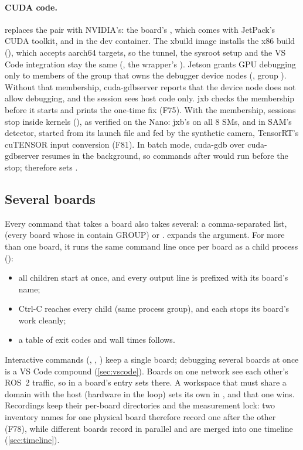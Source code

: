 \documentclass[11pt,a4paper]{article}
\newcommand{\jxb}{\textsf{jxb}}
\newcommand{\finding}[1]{\textsf{\small F#1}}
\begin{document}
\paragraph{CUDA code.}  replaces the pair with NVIDIA's: the board's , which comes
with JetPack's CUDA toolkit, and  in the dev container. The xbuild image installs the x86 build
(), which accepts aarch64 targets, so the tunnel, the sysroot setup and the VS Code integration
stay the same (, the wrapper's ). Jetson grants GPU debugging only to members
of the group that owns the debugger device nodes (, group ). Without that
membership, cuda-gdbserver reports that the device node does not allow debugging, and the session sees host code
only. \jxb{} checks the membership before it starts and prints the one-time fix (\finding{75}). With the membership,
sessions stop inside kernels (), as verified on the Nano: \jxb's
 on all 8 SMs, and in SAM's detector, started from its launch file and fed by
the synthetic camera, TensorRT's cuTENSOR input conversion 
(\finding{81}). In batch mode, cuda-gdb over cuda-gdbserver resumes in the background, so commands after
 would run before the stop;  therefore sets .

\subsection{Several boards}\label{sec:fleet}
Every command that takes a board also takes several: a comma-separated list,  (every board whose
 in  contain GROUP) or .  expands the argument. For more than one
board, it runs the same command line once per board as a child process ():
\begin{itemize}
  \item all children start at once, and every output line is prefixed with its board's name;
  \item Ctrl-C reaches every child (same process group), and each stops its board's work cleanly;
  \item a table of exit codes and wall times follows.
\end{itemize}
Interactive commands (, , ) keep a single board; debugging several boards at once is a
VS Code compound (\cref{sec:vscode}). Boards on one network see each other's ROS~2 traffic, so  in
a board's entry sets  there. A workspace that must share a domain with the host (hardware in the
loop) sets its own in , and that one wins. Recordings keep their per-board directories and the
measurement lock: two inventory names for one physical board therefore record one after the other (\finding{78}),
while different boards record in parallel and are merged into one timeline (\cref{sec:timeline}).
\end{document}
